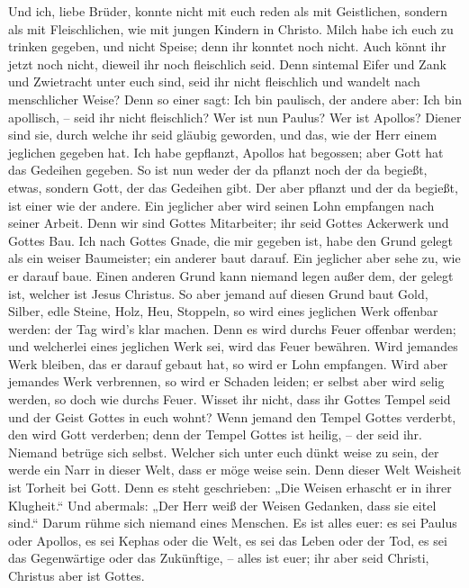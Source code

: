  Und ich, liebe Brüder, konnte nicht mit euch reden als
mit Geistlichen, sondern als mit Fleischlichen, wie mit jungen Kindern
in Christo.  Milch habe ich euch zu trinken gegeben, und
nicht Speise; denn ihr konntet noch nicht. Auch könnt ihr jetzt noch
nicht,  dieweil ihr noch fleischlich seid. Denn sintemal
Eifer und Zank und Zwietracht unter euch sind, seid ihr nicht
fleischlich und wandelt nach menschlicher Weise?  Denn so
einer sagt: Ich bin paulisch, der andere aber: Ich bin apollisch, --
seid ihr nicht fleischlich?  Wer ist nun Paulus? Wer ist
Apollos? Diener sind sie, durch welche ihr seid gläubig geworden, und
das, wie der Herr einem jeglichen gegeben hat.  Ich habe
gepflanzt, Apollos hat begossen; aber Gott hat das Gedeihen gegeben.
 So ist nun weder der da pflanzt noch der da begießt,
etwas, sondern Gott, der das Gedeihen gibt.  Der aber
pflanzt und der da begießt, ist einer wie der andere. Ein jeglicher aber
wird seinen Lohn empfangen nach seiner Arbeit.  Denn wir
sind Gottes Mitarbeiter; ihr seid Gottes Ackerwerk und Gottes Bau.
 Ich nach Gottes Gnade, die mir gegeben ist, habe den
Grund gelegt als ein weiser Baumeister; ein anderer baut darauf. Ein
jeglicher aber sehe zu, wie er darauf baue.  Einen
anderen Grund kann niemand legen außer dem, der gelegt ist, welcher ist
Jesus Christus.  So aber jemand auf diesen Grund baut
Gold, Silber, edle Steine, Holz, Heu, Stoppeln,  so wird
eines jeglichen Werk offenbar werden: der Tag wird's klar machen. Denn
es wird durchs Feuer offenbar werden; und welcherlei eines jeglichen
Werk sei, wird das Feuer bewähren.  Wird jemandes Werk
bleiben, das er darauf gebaut hat, so wird er Lohn empfangen.
 Wird aber jemandes Werk verbrennen, so wird er Schaden
leiden; er selbst aber wird selig werden, so doch wie durchs Feuer.
 Wisset ihr nicht, dass ihr Gottes Tempel seid und der
Geist Gottes in euch wohnt?  Wenn jemand den Tempel
Gottes verderbt, den wird Gott verderben; denn der Tempel Gottes ist
heilig, -- der seid ihr.  Niemand betrüge sich selbst.
Welcher sich unter euch dünkt weise zu sein, der werde ein Narr in
dieser Welt, dass er möge weise sein.  Denn dieser Welt
Weisheit ist Torheit bei Gott. Denn es steht geschrieben: „Die Weisen
erhascht er in ihrer Klugheit.``  Und abermals: „Der Herr
weiß der Weisen Gedanken, dass sie eitel sind.``  Darum
rühme sich niemand eines Menschen. Es ist alles euer:  es
sei Paulus oder Apollos, es sei Kephas oder die Welt, es sei das Leben
oder der Tod, es sei das Gegenwärtige oder das Zukünftige, -- alles ist
euer;  ihr aber seid Christi, Christus aber ist Gottes.

